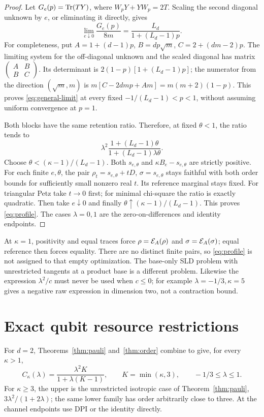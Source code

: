\begin{proof}
Let \(G_e(p)=\operatorname{Tr}(TY)\), where \(W_pY+YW_p=2T\). Scaling the second diagonal unknown by \(e\), or eliminating it directly, gives
\begin{equation}\label{eq:general-limit}
 \lim_{e\downarrow0}\frac{G_e(p)}{8m}=\frac{L_d}{1+(L_d-1)p}.
\end{equation}
For completeness, put \(A=1+(d-1)p\), \(B=dp\sqrt m\), \(C=2+(dm-2)p\). The limiting system for the off-diagonal unknown and the scaled diagonal has matrix \(\left(\begin{smallmatrix}A&B\\B&C\end{smallmatrix}\right)\). Its determinant is \(2(1-p)[1+(L_d-1)p]\); the numerator from the direction \((\sqrt m,m)\) is \(m[C-2dmp+Am]=m(m+2)(1-p)\). This proves \eqref{eq:general-limit} at every fixed \(-1/(L_d-1)<p<1\), without assuming uniform convergence at \(p=1\).

Both blocks have the same retention ratio. Therefore, at fixed \(\theta<1\), the ratio tends to
\[
 \lambda^2\frac{1+(L_d-1)\theta}{1+(L_d-1)\lambda\theta}.
\]
Choose \(\theta<(\kappa-1)/(L_d-1)\). Both \(s_{e,\theta}\) and \(\kappa B_e-s_{e,\theta}\) are strictly positive. For each finite \(e,\theta\), the pair \(\rho_t=s_{e,\theta}+tD\), \(\sigma=s_{e,\theta}\) stays faithful with both order bounds for sufficiently small nonzero real \(t\). Its reference marginal stays fixed. For triangular Petz take \(t\to0\) first; for minimal chi-square the ratio is exactly quadratic. Then take \(e\downarrow0\) and finally \(\theta\uparrow(\kappa-1)/(L_d-1)\). This proves \eqref{eq:profile}. The cases \(\lambda=0,1\) are the zero-on-differences and identity endpoints.
\end{proof}

\begin{remark}
At \(\kappa=1\), positivity and equal traces force \(\rho=\mathcal E_A(\rho)\) and \(\sigma=\mathcal E_A(\sigma)\); equal reference then forces equality. There are no distinct finite pairs, so \eqref{eq:profile} is not assigned to that empty optimization. The base-only SLD problem with unrestricted tangents at a product base is a different problem. Likewise the expression \(\lambda^2/c\) must never be used when \(c\le0\); for example \(\lambda=-1/3,\kappa=5\) gives a negative raw expression in dimension two, not a contraction bound.
\end{remark}

\section{Exact qubit resource restrictions}\label{sec:resources}
For \(d=2\), Theorems~\ref{thm:pauli} and~\ref{thm:order} combine to give, for every \(\kappa>1\),
\[
 C_\kappa(\lambda)=\frac{\lambda^2K}{1+\lambda(K-1)},\qquad K=\min(\kappa,3),\qquad -1/3\le\lambda\le1.
\]
For \(\kappa\ge3\), the upper is the unrestricted isotropic case of Theorem~\ref{thm:pauli}, \(3\lambda^2/(1+2\lambda)\); the same lower family has order arbitrarily close to three. At the channel endpoints use DPI or the identity directly.

